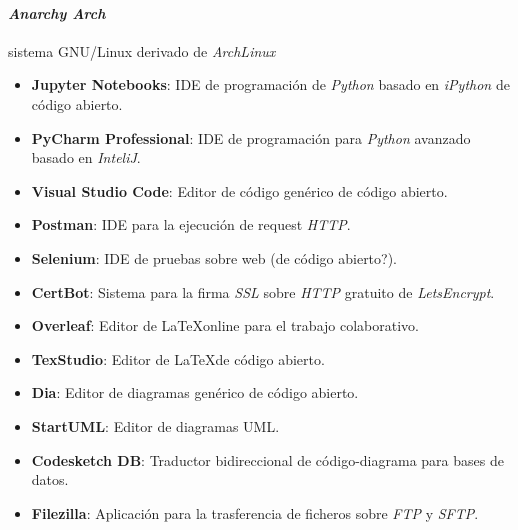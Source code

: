 \paragraph{\textit{Anarchy Arch}}sistema GNU/Linux derivado de \textit{ArchLinux}\cite{tool:aarch,wiki:arch}
\begin{itemize}
	\item \textbf{Jupyter Notebooks}: IDE de programación de \textit{Python} basado en \textit{iPython} de código abierto.
	\item \textbf{PyCharm Professional}: IDE de programación para \textit{Python} avanzado basado en \textit{InteliJ}.
	\item \textbf{Visual Studio Code}: Editor de código genérico de código abierto.
	\item \textbf{Postman}: IDE para la ejecución de request \textit{HTTP}.
	\item \textbf{Selenium}: IDE de pruebas sobre web (de código abierto?).
	
	\item \textbf{CertBot}: Sistema para la firma \textit{SSL} sobre \textit{HTTP} gratuito de \textit{LetsEncrypt}.
	\item \textbf{Overleaf}: Editor de \LaTeX  online para el trabajo colaborativo.
	\item \textbf{TexStudio}: Editor de \LaTeX  de código abierto.
	\item \textbf{Dia}: Editor de diagramas genérico de código abierto.
	\item \textbf{StartUML}: Editor de diagramas UML.
	\item \textbf{Codesketch DB}: Traductor bidireccional de código-diagrama para bases de datos.
	\item \textbf{Filezilla}: Aplicación para la trasferencia de ficheros sobre \textit{FTP} y \textit{SFTP}.
\end{itemize}